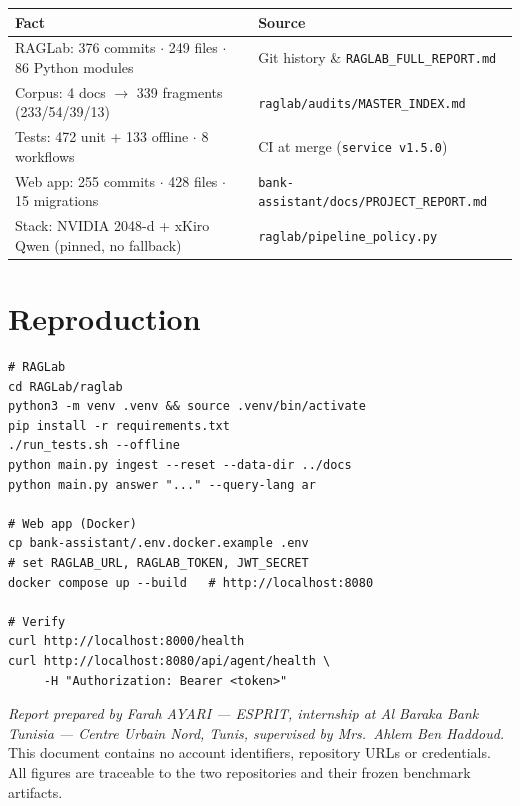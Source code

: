 \documentclass[a4paper,12pt]{report}
\newcommand{\StudentName}{Farah AYARI}
\newcommand{\CompanyName}{Al Baraka Bank Tunisia}
\newcommand{\CompanySite}{Centre Urbain Nord, Tunis}
\newcommand{\SupervisorName}{Mrs.\ Ahlem Ben Haddoud}
\begin{document}
\begin{table}[H]
\centering\small
\begin{tabular}{p{5.4cm}p{8.8cm}}
\toprule
\textbf{Fact} & \textbf{Source} \\
\midrule
RAGLab: 376 commits $\cdot$ 249 files $\cdot$ 86 Python modules & Git history \& \texttt{RAGLAB\_FULL\_REPORT.md} \\
Corpus: 4 docs $\rightarrow$ 339 fragments (233/54/39/13) & \texttt{raglab/audits/MASTER\_INDEX.md} \\
Tests: 472 unit + 133 offline $\cdot$ 8 workflows & CI at merge (\texttt{service v1.5.0}) \\
Web app: 255 commits $\cdot$ 428 files $\cdot$ 15 migrations & \texttt{bank-assistant/docs/PROJECT\_REPORT.md} \\
Stack: NVIDIA 2048-d + xKiro Qwen (pinned, no fallback) & \texttt{raglab/pipeline\_policy.py} \\
\bottomrule
\end{tabular}
\end{table}

\chapter{Reproduction}

\begin{verbatim}
# RAGLab
cd RAGLab/raglab
python3 -m venv .venv && source .venv/bin/activate
pip install -r requirements.txt
./run_tests.sh --offline
python main.py ingest --reset --data-dir ../docs
python main.py answer "..." --query-lang ar

# Web app (Docker)
cp bank-assistant/.env.docker.example .env
# set RAGLAB_URL, RAGLAB_TOKEN, JWT_SECRET
docker compose up --build   # http://localhost:8080

# Verify
curl http://localhost:8000/health
curl http://localhost:8080/api/agent/health \
     -H "Authorization: Bearer <token>"
\end{verbatim}

\vspace{1cm}
\begin{center}
\small\emph{Report prepared by \StudentName{} --- ESPRIT, internship at \CompanyName{} --- \CompanySite, supervised by \SupervisorName.}\\[3pt]
\footnotesize\color{textDark!65} This document contains no account identifiers, repository URLs or credentials. All figures are traceable to the two repositories and their frozen benchmark artifacts.
\end{center}
\end{document}
